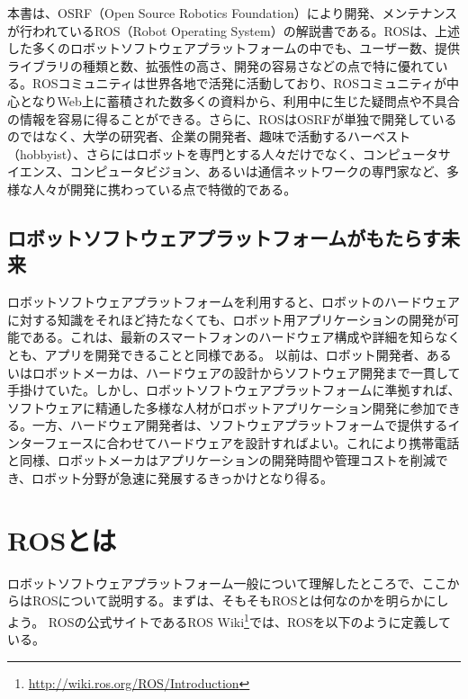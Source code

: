 本書は、OSRF（Open Source Robotics Foundation）により開発、メンテナンスが行われているROS（Robot Operating System）の解説書である。ROSは、上述した多くのロボットソフトウェアプラットフォームの中でも、ユーザー数、提供ライブラリの種類と数、拡張性の高さ、開発の容易さなどの点で特に優れている。ROSコミュニティは世界各地で活発に活動しており、ROSコミュニティが中心となりWeb上に蓄積された数多くの資料から、利用中に生じた疑問点や不具合の情報を容易に得ることができる。さらに、ROSはOSRFが単独で開発しているのではなく、大学の研究者、企業の開発者、趣味で活動するハーベスト（hobbyist）、さらにはロボットを専門とする人々だけでなく、コンピュータサイエンス、コンピュータビジョン、あるいは通信ネットワークの専門家など、多様な人々が開発に携わっている点で特徴的である。

\subsection{ロボットソフトウェアプラットフォームがもたらす未来}

ロボットソフトウェアプラットフォームを利用すると、ロボットのハードウェアに対する知識をそれほど持たなくても、ロボット用アプリケーションの開発が可能である。これは、最新のスマートフォンのハードウェア構成や詳細を知らなくとも、アプリを開発できることと同様である。
以前は、ロボット開発者、あるいはロボットメーカは、ハードウェアの設計からソフトウェア開発まで一貫して手掛けていた。しかし、ロボットソフトウェアプラットフォームに準拠すれば、ソフトウェアに精通した多様な人材がロボットアプリケーション開発に参加できる。一方、ハードウェア開発者は、ソフトウェアプラットフォームで提供するインターフェースに合わせてハードウェアを設計すればよい。これにより携帯電話と同様、ロボットメーカはアプリケーションの開発時間や管理コストを削減でき、ロボット分野が急速に発展するきっかけとなり得る。

\section{ROSとは}

ロボットソフトウェアプラットフォーム一般について理解したところで、ここからはROSについて説明する。まずは、そもそもROSとは何なのかを明らかにしよう。
ROSの公式サイトであるROS Wiki\footnote{\url{http://wiki.ros.org/ROS/Introduction}}では、ROSを以下のように定義している。\\

